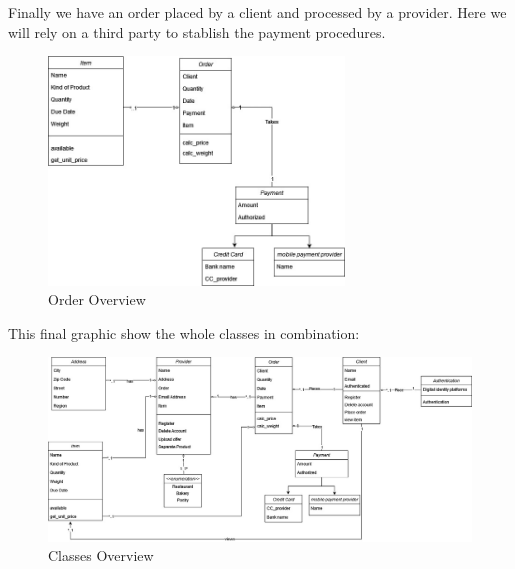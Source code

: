 Finally we have an order placed by a \gls{client} and processed by a \gls{provider}. Here we will rely on a third party 
to stablish the payment procedures.

\begin{figure}[H]
    \centering
    \includegraphics[width=0.7\textwidth]{assets/order_cd.jpg}
    \caption{Order Overview}
    \label{fig:order_cd}
\end{figure}

This final graphic show the whole classes in combination:

\begin{figure}[H]
    \centering
    \includegraphics[width=1\textwidth]{assets/classes_CD.jpg}
    \caption{Classes Overview}
    \label{fig:class_CD}
\end{figure}

 
